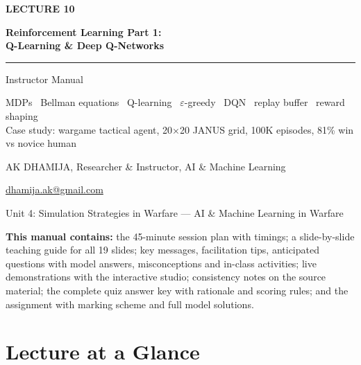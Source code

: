 \documentclass[11pt]{article}
\begin{document}
\begin{titlepage}\centering\vspace*{2.2cm}
{\color{AccN}\large\bfseries LECTURE 10\par}\vspace{0.6cm}
{\color{NavyN}\Huge\bfseries Reinforcement Learning Part 1:\\Q-Learning \& Deep Q-Networks\par}\vspace{0.6cm}
{\color{AccN}\rule{0.7\textwidth}{1.5pt}}\par\vspace{0.6cm}
{\LARGE Instructor Manual\par}\vspace{0.4cm}
{\large\begin{minipage}{0.85\textwidth}\centering MDPs \textbullet\ Bellman equations \textbullet\ Q-learning \textbullet\ $\varepsilon$-greedy \textbullet\ DQN \textbullet\ replay buffer \textbullet\ reward shaping\\Case study: wargame tactical agent, 20$\times$20 JANUS grid, 100K episodes, 81\% win vs novice human\end{minipage}\par}\vspace{2cm}
{\large AK DHAMIJA, Researcher \& Instructor, AI \& Machine Learning\par}\vspace{0.2cm}
{\normalsize \href{mailto:dhamija.ak@gmail.com}{dhamija.ak@gmail.com} \quad\textbullet{}\par}\vspace{0.3cm}
{Unit 4: Simulation Strategies in Warfare --- AI \& Machine Learning in Warfare\par}\vfill
\begin{tcolorbox}[colback=NavyN!4,colframe=NavyN,boxrule=0.6pt,arc=2pt,width=0.9\textwidth]\small
\textbf{This manual contains:} the 45-minute session plan with timings; a slide-by-slide teaching guide for all 19 slides; key messages, facilitation tips, anticipated questions with model answers, misconceptions and in-class activities; live demonstrations with the interactive studio; consistency notes on the source material; the complete quiz answer key with rationale and scoring rules; and the assignment with marking scheme and full model solutions.
\end{tcolorbox}
\end{titlepage}
\tableofcontents\newpage


\section{Lecture at a Glance}
\end{document}
